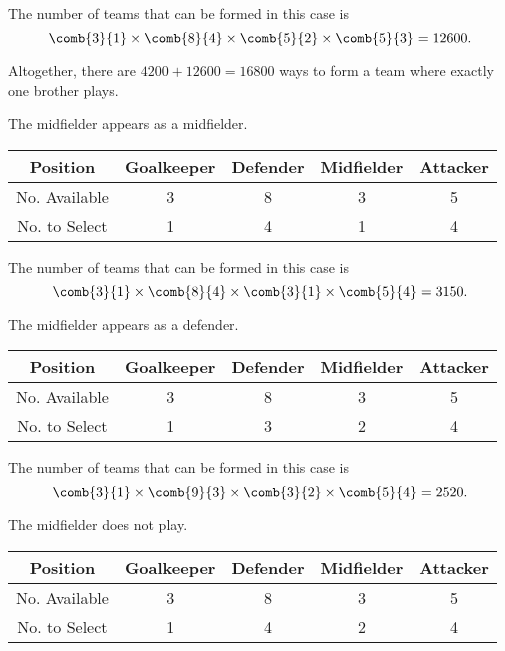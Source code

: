 \begin{solution}
\begin{ppart}
        The number of teams that can be formed in this case is \[\comb{3}{1} \times \comb{8}{4} \times \comb{5}{2} \times \comb{5}{3} = 12600.\]

        Altogether, there are $4200 + 12600 = 16800$ ways to form a team where exactly one brother plays.
    \end{ppart}
    \begin{ppart}
         The midfielder appears as a midfielder.

        \begin{table}[H]
            \centering
            \begin{tabular}{|c|c|c|c|c|}
            \hline
            Position & Goalkeeper & Defender & Midfielder & Attacker \\ \hline
            No. Available & 3 & 8 & 3 & 5 \\ \hline
            No. to Select & 1 & 4 & 1 & 4 \\ \hline
            \end{tabular}
        \end{table}

        The number of teams that can be formed in this case is \[\comb{3}{1} \times \comb{8}{4} \times \comb{3}{1} \times \comb{5}{4} = 3150.\]

         The midfielder appears as a defender.

        \begin{table}[H]
            \centering
            \begin{tabular}{|c|c|c|c|c|}
            \hline
            Position & Goalkeeper & Defender & Midfielder & Attacker \\ \hline
            No. Available & 3 & 8 & 3 & 5 \\ \hline
            No. to Select & 1 & 3 & 2 & 4 \\ \hline
            \end{tabular}
        \end{table}

        The number of teams that can be formed in this case is \[\comb{3}{1} \times \comb{9}{3} \times \comb{3}{2} \times \comb{5}{4} = 2520.\]

         The midfielder does not play.

        \begin{table}[H]
            \centering
            \begin{tabular}{|c|c|c|c|c|}
            \hline
            Position & Goalkeeper & Defender & Midfielder & Attacker \\ \hline
            No. Available & 3 & 8 & 3 & 5 \\ \hline
            No. to Select & 1 & 4 & 2 & 4 \\ \hline
            \end{tabular}
        \end{table}


\end{ppart}
\end{solution}
